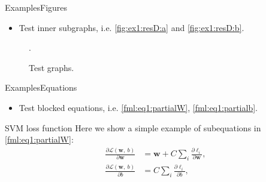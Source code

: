 \documentclass[10pt,xcolor={dvipsnames},aspectratio=169]{beamer}
\begin{document}
\begin{frame}{Examples}{Figures}
\begin{itemize}
  \item Test inner subgraphs, i.e. \cref{fig:ex1:resD:a} and \cref{fig:ex1:resD:b}.
\end{itemize}

\begin{figure}[htbp]
  \centering
  \DeclareGraphicsExtensions.
  \caption{Test graphs.}\label{fig:ex1:resD}
\end{figure}
\end{frame}


\begin{frame}{Examples}{Equations}
\begin{itemize}
  \item Test blocked equations, i.e. \eqref{fml:eq1:partialW}, \eqref{fml:eq1:partialb}.
\end{itemize}

\begin{block}{SVM loss function}
  \label{blc:eq1} Here we show a simple example of subequations in \eqref{fml:eq1:partialW}:
  \begin{subequations}
    \renewcommand{\theequation}
    {\theparentequation-\arabic{equation}}
    \begin{align}
      \frac{\partial \mathcal{L}(\mathbf{w},~b)}{\partial \mathbf{w}} &= \mathbf{w} + C \sum\limits_i\frac{\partial \ell_i}{\partial \mathbf{w}}, \label{fml:eq1:partialW}\\
      \frac{\partial \mathcal{L}(\mathbf{w},~b)}{\partial b} &= C \sum\limits_i\frac{\partial \ell_i}{\partial b}, \label{fml:eq1:partialb}
    \end{align}
  \end{subequations}
\end{block}
\end{frame}
\end{document}
